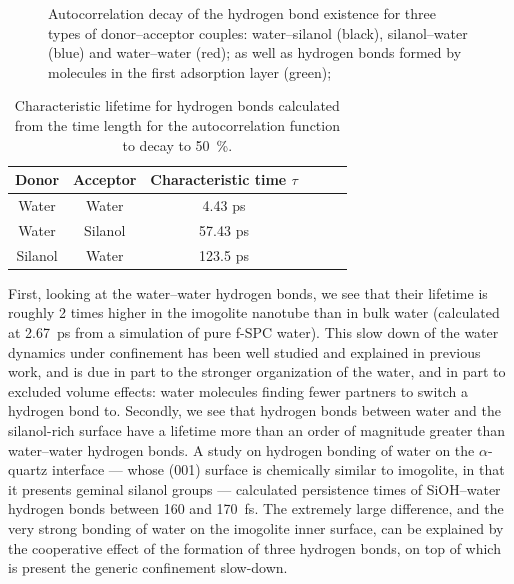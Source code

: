 \documentclass[thesis]{subfiles}
\begin{document}
\begin{figure}[ht]
    \centering
    
    \caption{Autocorrelation decay of the hydrogen bond existence for three types
    of donor--acceptor couples: water--silanol (black), silanol--water (blue) and
    water--water (red); as well as hydrogen bonds formed by molecules in the
    first adsorption layer (green);}
    \label{fig:imogolite:hbonds:lifetime}
\end{figure}

\begin{table}[ht]
    \centering
    \begin{tabular}{c c c c c c}
        \toprule
        Donor & Acceptor & Characteristic time $\tau$ \\
        \midrule
        Water & Water & 4.43 ps \\
        Water & Silanol & 57.43 ps\\
        Silanol & Water & 123.5 ps \\
        \bottomrule
    \end{tabular}
    \caption{Characteristic lifetime for hydrogen bonds calculated from the time
    length for the autocorrelation function to decay to 50~\%.}
    \label{tab:imogolite:hbonds:lifetime}
\end{table}

First, looking at the water--water hydrogen bonds, we see that their lifetime is
roughly 2 times higher in the imogolite nanotube than in bulk water (calculated
at \SI{2.67}{ps} from a simulation of pure f-SPC water). This slow down of the
water dynamics under confinement has been well studied and explained in previous
work, and is due in part to the stronger organization of the water, and in part
to excluded volume effects: water molecules finding fewer partners to switch
a hydrogen bond to\cite{Fogarty2014, Fogarty2014-2}. Secondly, we see that
hydrogen bonds between water and the silanol-rich surface have a lifetime more
than an order of magnitude greater than water--water hydrogen bonds. A study on
hydrogen bonding of water on the $\alpha$-quartz interface --- whose (001)
surface is chemically similar to imogolite, in that it presents geminal silanol
groups --- calculated persistence times of SiOH--water hydrogen bonds between
160 and \SI{170}{fs}\cite{Ozkanlar2013}. The extremely large difference, and the
very strong bonding of water on the imogolite inner surface, can be explained by
the cooperative effect of the formation of three hydrogen bonds, on top of which
is present the generic confinement slow-down.
\end{document}

